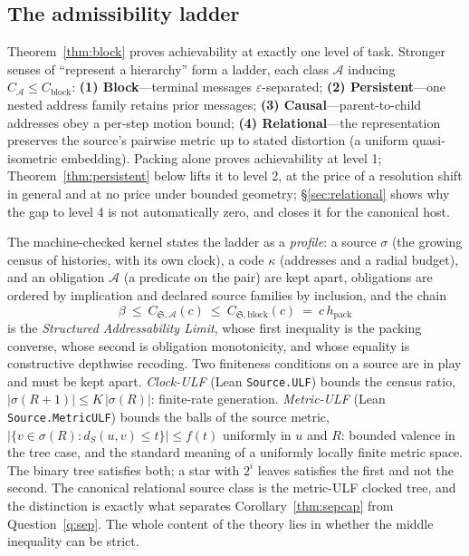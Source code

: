\documentclass[11pt,reqno]{amsart}
\theoremstyle{plain}
\theoremstyle{definition}
\newcommand{\hpack}{h_{\mathrm{pack}}}
\newcommand{\Cblock}{C_{\mathrm{block}}}
\newcommand{\eps}{\varepsilon}
\begin{document}
\subsection{The admissibility ladder}\label{sec:ladder}

Theorem~\ref{thm:block} proves achievability at exactly one level of task. Stronger senses of ``represent a hierarchy'' form a ladder, each class $\mathcal A$ inducing $C_{\mathcal A}\le\Cblock$: \textbf{(1) Block}---terminal messages $\eps$-separated; \textbf{(2) Persistent}---one nested address family retains prior messages; \textbf{(3) Causal}---parent-to-child addresses obey a per-step motion bound; \textbf{(4) Relational}---the representation preserves the source's pairwise metric up to stated distortion (a uniform quasi-isometric embedding). Packing alone proves achievability at level 1; Theorem~\ref{thm:persistent} below lifts it to level 2, at the price of a resolution shift in general and at no price under bounded geometry; \S\ref{sec:relational} shows why the gap to level 4 is not automatically zero, and closes it for the canonical host.

The machine-checked kernel states the ladder as a \emph{profile}: a source $\sigma$ (the growing census of histories, with its own clock), a code $\kappa$ (addresses and a radial budget), and an obligation $\mathcal A$ (a predicate on the pair) are kept apart, obligations are ordered by implication and declared source families by inclusion, and the chain
\[
\beta\ \le\ C_{\mathfrak S,\mathcal A}(c)\ \le\ C_{\mathfrak S,\mathrm{block}}(c)\ =\ c\,\hpack
\]
is the \emph{Structured Addressability Limit}, whose first inequality is the packing converse, whose second is obligation monotonicity, and whose equality is constructive depthwise recoding. Two finiteness conditions on a source are in play and must be kept apart. \emph{Clock-ULF} (Lean \texttt{Source.ULF}) bounds the census ratio, $|\sigma(R{+}1)|\le K\,|\sigma(R)|$: finite-rate generation. \emph{Metric-ULF} (Lean \texttt{Source.MetricULF}) bounds the balls of the source metric, $|\{v\in\sigma(R):d_S(u,v)\le t\}|\le f(t)$ uniformly in $u$ and $R$: bounded valence in the tree case, and the standard meaning of a uniformly locally finite metric space. The binary tree satisfies both; a star with $2^i$ leaves satisfies the first and not the second. The canonical relational source class is the metric-ULF clocked tree, and the distinction is exactly what separates Corollary~\ref{thm:sepcap} from Question~\ref{q:sep}. The whole content of the theory lies in whether the middle inequality can be strict.
\end{document}
